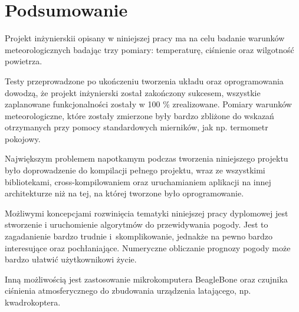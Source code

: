 \chapter{Podsumowanie}
Projekt inżynierskii opisany w niniejszej pracy ma na celu badanie warunków meteorologicznych badając trzy pomiary: temperaturę, ciśnienie oraz wilgotność powietrza.

Testy przeprowadzone po ukończeniu tworzenia układu oraz oprogramowania dowodzą, że projekt inżynierski został zakończony sukcesem, wszystkie zaplanowane funkcjonalności zostały w 100 \% zrealizowane. Pomiary warunków meteorologiczne, które zostały zmierzone były bardzo zbliżone do wskazań otrzymanych przy pomocy standardowych mierników, jak np. termometr pokojowy.

Największym problemem napotkamym podczas tworzenia niniejszego projektu było doprowadzenie do kompilacji pełnego projektu, wraz ze wszystkimi bibliotekami, cross-kompilowaniem oraz uruchamianiem aplikacji na innej architekturze niż na tej, na której tworzone było oprogramowanie.

Możliwymi koncepcjami rozwinięcia tematyki niniejszej pracy dyplomowej jest stworzenie i uruchomienie algorytmów do przewidywania pogody. Jest to zagadanienie bardzo trudnie i~skomplikowanie, jednakże na pewno bardzo interesujące oraz pochłaniające. Numeryczne obliczanie prognozy pogody może bardzo ułatwić użytkownikowi życie.

Inną możliwością jest zastosowanie mikrokomputera BeagleBone oraz czujnika ciśnienia atmosferycznego do zbudowania urządzenia latającego, np. kwadrokoptera.